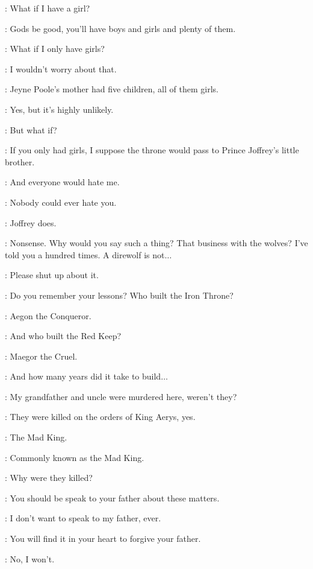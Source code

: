 \SANSA: What if I have a girl? 

\SEPTAMORDANE: Gods be good, you'll have boys and girls and plenty of them. 

\SANSA: What if I only have girls? 

\SEPTAMORDANE: I wouldn't worry about that. 

\SANSA: Jeyne Poole's mother had five children, all of them girls. 

\SEPTAMORDANE: Yes, but it's highly unlikely. 

\SANSA: But what if? 

\SEPTAMORDANE: If you only had girls, I suppose the throne would pass to Prince Joffrey's little brother. 

\SANSA: And everyone would hate me. 

\SEPTAMORDANE: Nobody could ever hate you. 

\SANSA: Joffrey does. 

\SEPTAMORDANE: Nonsense. Why would you say such a thing? That business with the wolves? I've told you a hundred times. A direwolf is not$\ldots$ 

\SANSA: Please shut up about it. 

\SEPTAMORDANE: Do you remember your lessons? Who built the Iron Throne? 

\SANSA: Aegon the Conqueror. 

\SEPTAMORDANE: And who built the Red Keep? 

\SANSA: Maegor the Cruel. 

\SEPTAMORDANE: And how many years did it take to build$\ldots$ 

\SANSA: My grandfather and uncle were murdered here, weren't they? 

\SEPTAMORDANE: They were killed on the orders of King Aerys, yes. 

\SANSA: The Mad King. 

\SEPTAMORDANE: Commonly known as the Mad King. 

\SANSA: Why were they killed? 

\SEPTAMORDANE: You should be speak to your father about these matters. 

\SANSA: I don't want to speak to my father, ever. 

\SEPTAMORDANE: You will find it in your heart to forgive your father. 

\SANSA: No, I won't. 

\scene


